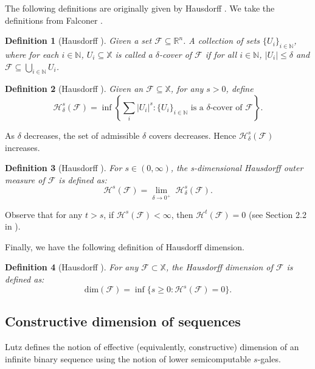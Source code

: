 \documentclass[11pt]{article}
\newtheorem{definition}{Definition}
\newcommand{\N}{\mathbb{N}}
\newcommand{\R}{\mathbb{R}}
\renewcommand{\dim}{{\mathrm{dim}}}
\newcommand{\F}{{\mathcal{F}}}
\newcommand{\X}{{\mathbb{X}}}
\renewcommand{\F}{\mathcal{F}}
\begin{document}
The following definitions are originally given by Hausdorff \cite{Hausdorff1919}. We take the definitions from Falconer \cite{Falc03}. 

\begin{definition}  [Hausdorff \cite{Hausdorff1919}]
	Given a set $\F \subseteq \R^n$. A 
	collection of sets $\{U_i\}_{i \in \N}$, where for each $i \in \N$, $U_i \subseteq \X$  is
	called a \emph{$\delta$-cover of $\F$} if for all
	$i \in \N$, $|U_i| \leq \delta$ and $\F \subseteq
	\bigcup_{i\in\N}{U_i}$.
\end{definition}

\begin{definition}  [Hausdorff \cite{Hausdorff1919}]
	Given an $\F \subseteq \X$, for any $s>0$, define
	$$
	\mathcal{H}^s_\delta(\F) = \inf\left\{\sum_i |U_i|^s :
	\{U_i\}_{i\in\N} \text{ is a } \delta\text{-cover of } \F
	\right\}.
	$$
\end{definition}

As $\delta$ decreases, the set of admissible $\delta$ covers decreases.
Hence $\mathcal{H}^s_\delta(\F)$ increases.

\begin{definition}  [Hausdorff \cite{Hausdorff1919}]
	For $s \in (0,\infty)$, the \emph{s-dimensional Hausdorff outer 
		measure} of $\F$ is defined as:
	$$\mathcal{H}^s(\F) = \lim\limits_{\delta \rightarrow 0^+}
	\; \mathcal{H}^s_\delta(\F).$$
\end{definition}


Observe that for
any $t>s$, if $\mathcal{H}^s(\F) < \infty$, then
$\mathcal{H}^t(\F) = 0$ (see Section 2.2 in \cite{Falc03}).

Finally, we have the following definition of Hausdorff dimension.

\begin{definition} [Hausdorff \cite{Hausdorff1919}]
	For any $\F \subset \X$, the \emph{Hausdorff dimension} of $\F$ is defined as:
	$$\dim(\F) = \inf \{s\geq 0 : \mathcal{H}^s(\F) = 0 \}
	.$$
\end{definition}

\subsection{Constructive dimension of sequences}

Lutz \cite{Lutz2003b} defines the notion of effective (equivalently,
constructive) dimension of an infinite binary sequence
using the notion of lower semicomputable $s$-gales. 
\end{document}
